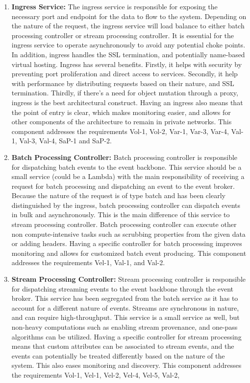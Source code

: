 \documentclass{bmcart}
\begin{document}
\begin{enumerate}
    \item \textbf{Ingress Service:} The ingress service is responsible for exposing the necessary port and endpoint for the data to flow to the system. Depending on the nature of the request, the ingress service will load balance to either batch processing controller or stream processing controller. It is essential for the ingress service to operate asynchronously to avoid any potential choke points. In addition, ingress handles the SSL termination, and potentially name-based virtual hosting. Ingress has several benefits. Firstly, it helps with security by preventing port proliferation and direct access to services. Secondly, it help with performance by distributing requests based on their nature, and SSL termination. Thirdly, if there's a need for object mutation through a proxy, ingress is the best architectural construct. Having an ingress also means that the point of entry is clear, which makes monitoring easier, and allows for other components of the architecture to remain in private networks. This component addresses the
    requirements Vol-1, Vol-2, Var-1, Var-3, Var-4, Val-1,
    Val-3, Val-4, SaP-1 and SaP-2.
    \item \textbf{Batch Processing Controller:} Batch processing controller is responsible for dispatching batch events to the event backbone. This service should be a small service (could be a Lambda) with the main responsibility of receiving a request for batch processing and dispatching an event to the event broker. Because the nature of the request is of type batch and has been clearly distinguished by the ingress, batch processing controller can dispatch events in bulk and asynchronously. This is the main difference of this service to stream processing controller. Batch processing controller can execute other non compute-intensive tasks such as scrubbing properties from the given data or adding headers. Having a specific controller for batch processing improves monitoring and allows for customized batch event producing. This component addresses the requirements Vel-1, Val-1, and Val-2.
    \item \textbf{Stream Processing Controller:} Stream processing controller is responsible for dispatching streaming events to the event backbone through the event broker. This service has been segregated from the batch service as it has to account for a different nature of events. Streams are synchronous in nature, and can require high-throughput. This service is a small service as well, but non-heavy computations such as enabling stream provenance, and one-pass algorithms can be utilized. Having a specific controller for stream processing means that custom attributes can be associated to stream events, and the events can potentially be treated differently based on the nature of the system. This also eases monitoring and discovery. This component addresses the requirements Vol-1, Vel-1, Vel-2, Vel-4, Vel-5, Val-2,

\end{enumerate}
\end{document}
